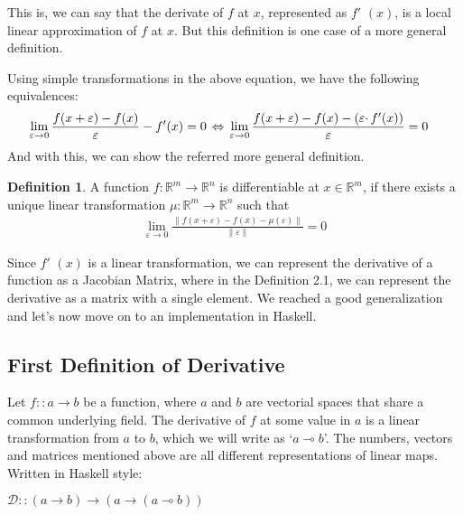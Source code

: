 \documentclass[11pt,a4]{article}
\def\R{\mathbb{R}}
\newcommand{\norm}[1]{\left\lVert#1\right\rVert}
\theoremstyle{definition}
\newtheorem{defi}{Definition}[section]
\theoremstyle{Definition}
\theoremstyle{Definition}
\begin{document}
	This is, we can say that the derivate of $f$ at $x$, represented as $f $$'$ $(x)$, is a local linear approximation of $f$ at $x$.
	But this definition is one case of a more general definition. \par 
	Using simple transformations in the above equation, we have the following \newline equivalences:
		\begin{align*}
		\hspace{-3mm} \lim_{\varepsilon \to 0} \frac{\textit{$f(x+\varepsilon)-f(x)$}}{\varepsilon} - \textit{$f'(x)$} = 0 \hspace{0.5mm} 
		\Leftrightarrow \hspace{0.5mm} \lim_{\varepsilon \to 0} \frac{\textit{$f(x+\varepsilon)-f(x)$} - (\varepsilon \cdotp \textit{$f'(x)$})}{\varepsilon} = 0 
		\end{align*}
	And with this, we can show the referred more general definition.
	\begin{defi}
		A function $f:\R^{m} \to \R^{n}$ is differentiable at $x \in \R^{m}$, if there exists
		a unique linear transformation $\mu:\R^{m} \to \R^{n}$ such that
		\begin{align*}
		\lim_{\varepsilon \to 0} \frac{ \norm{ \textit{$f(x+\varepsilon)-f(x)-$} \mu (\varepsilon) } }{ \norm{ \varepsilon }} = 0
		\end{align*}
	\end{defi}
	
	Since $f $$'$ $(x)$ is a linear transformation, we can represent the derivative of a function as a Jacobian Matrix, where in the Definition 2.1, we can represent the derivative as a matrix with a single element. We reached a good generalization and let's now move on to an implementation in Haskell.
	
	\subsection{First Definition of Derivative}
	
	Let $f::a \to b$ be a function, where $a$ and $b$ are vectorial spaces that share a common underlying field. The derivative of $f$ at some value in $a$ is a linear transformation from $a$ to $b$, which we will write as \enquote*{$a \multimap b$}. The numbers, vectors and matrices mentioned above are all different representations of linear maps.
	Written in Haskell style:
	
	\quad $\mathcal{D} :: (a \to b) \to (a \to (a \multimap b))$
	
\end{document}
